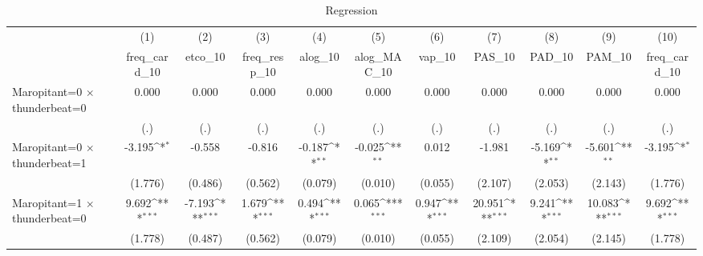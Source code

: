 \begin{table}[htbp]\centering
\def\sym#1{\ifmmode^{#1}\else\(^{#1}\)\fi}
\caption{Regression}
\begin{tabular}{l*{10}{c}}
\toprule
                    &\multicolumn{1}{c}{(1)}&\multicolumn{1}{c}{(2)}&\multicolumn{1}{c}{(3)}&\multicolumn{1}{c}{(4)}&\multicolumn{1}{c}{(5)}&\multicolumn{1}{c}{(6)}&\multicolumn{1}{c}{(7)}&\multicolumn{1}{c}{(8)}&\multicolumn{1}{c}{(9)}&\multicolumn{1}{c}{(10)}\\
                    &\multicolumn{1}{c}{freq\_card\_10}&\multicolumn{1}{c}{etco\_10}&\multicolumn{1}{c}{freq\_resp\_10}&\multicolumn{1}{c}{alog\_10}&\multicolumn{1}{c}{alog\_MAC\_10}&\multicolumn{1}{c}{vap\_10}&\multicolumn{1}{c}{PAS\_10}&\multicolumn{1}{c}{PAD\_10}&\multicolumn{1}{c}{PAM\_10}&\multicolumn{1}{c}{freq\_card\_10}\\
\midrule
Maropitant=0 $\times$ thunderbeat=0&       0.000         &       0.000         &       0.000         &       0.000         &       0.000         &       0.000         &       0.000         &       0.000         &       0.000         &       0.000         \\
                    &         (.)         &         (.)         &         (.)         &         (.)         &         (.)         &         (.)         &         (.)         &         (.)         &         (.)         &         (.)         \\
\addlinespace
Maropitant=0 $\times$ thunderbeat=1&      -3.195\sym{*}  &      -0.558         &      -0.816         &      -0.187\sym{**} &      -0.025\sym{**} &       0.012         &      -1.981         &      -5.169\sym{**} &      -5.601\sym{**} &      -3.195\sym{*}  \\
                    &     (1.776)         &     (0.486)         &     (0.562)         &     (0.079)         &     (0.010)         &     (0.055)         &     (2.107)         &     (2.053)         &     (2.143)         &     (1.776)         \\
\addlinespace
Maropitant=1 $\times$ thunderbeat=0&       9.692\sym{***}&      -7.193\sym{***}&       1.679\sym{***}&       0.494\sym{***}&       0.065\sym{***}&       0.947\sym{***}&      20.951\sym{***}&       9.241\sym{***}&      10.083\sym{***}&       9.692\sym{***}\\
                    &     (1.778)         &     (0.487)         &     (0.562)         &     (0.079)         &     (0.010)         &     (0.055)         &     (2.109)         &     (2.054)         &     (2.145)         &     (1.778)         \\

\end{tabular}
\end{table}
